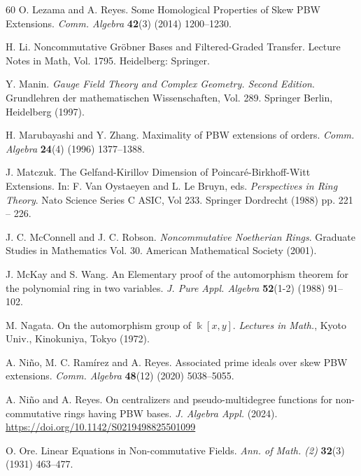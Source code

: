 \documentclass{amsart}
\theoremstyle{definition}
\theoremstyle{remark}
\numberwithin{equation}{section}
\begin{document}
\begin{thebibliography}{60}
 O. Lezama and A. Reyes. Some Homological Properties of Skew PBW Extensions. {\em Comm. Algebra} {\bf 42}(3) (2014) 1200--1230.

 H. Li. Noncommutative Gr\"obner Bases and Filtered-Graded Transfer. Lecture Notes in Math, Vol. 1795. Heidelberg: Springer.

 Y. Manin. {\em Gauge Field Theory and Complex Geometry. Second Edition}. Grundlehren der mathematischen Wissenschaften, Vol. 289. Springer Berlin, Heidelberg (1997).

 H. Marubayashi and Y. Zhang. Maximality of {P}{B}{W} extensions of orders. {\em Comm. Algebra} {\bf 24}(4) (1996) 1377--1388.

 J. Matczuk. The Gelfand-Kirillov Dimension of Poincar\'e-Birkhoff-Witt Extensions. In: F. Van Oystaeyen and L. Le Bruyn, eds. {\em Perspectives in Ring Theory}. Nato Science Series C ASIC, Vol 233. Springer Dordrecht (1988) pp. 221 -- 226.

 J. C. McConnell and J. C. Robson. {\em Noncommutative Noetherian Rings}. Graduate Studies in Mathematics Vol. 30. American Mathematical Society (2001).

 J. McKay and S. Wang. An Elementary proof of the automorphism theorem for the polynomial ring in two variables. {\em J. Pure Appl. Algebra} {\bf 52}(1-2) (1988) 91--102.

 M. Nagata. On the automorphism group of $\Bbbk[x, y]$. {\em Lectures in Math.}, Kyoto Univ., Kinokuniya, Tokyo (1972).

 A. Ni\~no, M. C. Ram\'irez and A. Reyes. Associated prime ideals over skew PBW extensions. {\em Comm. Algebra} {\bf 48}(12) (2020) 5038--5055.

 A. Ni\~no and A. Reyes. On centralizers and pseudo-multidegree functions for non-commutative rings having PBW bases. {\em J. Algebra Appl.} (2024). \url{https://doi.org/10.1142/S0219498825501099}


 O. Ore. Linear Equations in Non-commutative Fields. {\em Ann. of Math. (2)} {\bf 32}(3) (1931) 463--477.


\end{thebibliography}
\end{document}
